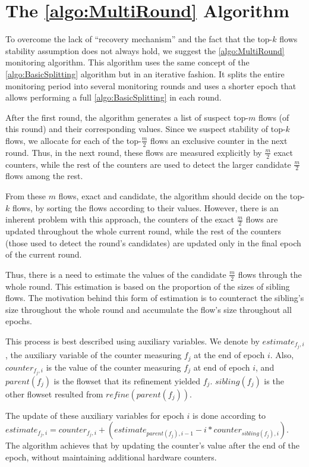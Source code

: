 \section{The \ref{algo:MultiRound} Algorithm}
To overcome the lack of ``recovery mechanism'' and the fact that the top-$k$ flows stability assumption does not always hold, we suggest the \ref{algo:MultiRound} monitoring algorithm.
This algorithm uses the same concept of the \ref{algo:BasicSplitting} algorithm but in an iterative fashion. It splits the entire monitoring period into several monitoring rounds and uses a shorter epoch that allows performing a full \ref{algo:BasicSplitting} in each round.

After the first round, the algorithm generates a list of suspect top-$m$ flows (of this round) and their corresponding values. Since we suspect stability of top-$k$ flows, we allocate for each of the top-$\frac{m}{2}$ flows an exclusive counter in the next round. Thus, in the next round, these flows are measured explicitly by $\frac{m}{2}$ exact counters, while the rest of the counters are used to detect the larger candidate $\frac{m}{2}$ flows among the rest.

From these $m$ flows, exact and candidate, the algorithm should decide on the top-$k$ flows, by sorting the flows according to their values.
However, there is an inherent problem with this approach, the counters of the exact $\frac{m}{2}$ flows are updated throughout the whole current round, while the rest of the counters (those used to detect the round's candidates) are updated only in the final epoch of the current round.

Thus, there is a need to estimate the values of the candidate $\frac{m}{2}$ flows through the whole round. This estimation is based on the proportion of the sizes of sibling flows. The motivation behind this form of estimation is to counteract the sibling's size throughout the whole round and accumulate the flow's size throughout all epochs.

This process is best described using auxiliary variables. We denote by $estimate_{f_j, i}$, the auxiliary variable of the counter measuring $f_j$ at the end of epoch $i$. Also, $counter_{f_j,i}$ is the value of the counter measuring $f_j$ at end of epoch $i$, and $parent(f_j)$ is the flowset that its refinement yielded $f_j$. $sibling(f_j)$ is the other flowset resulted from $refine(parent(f_j))$.

The update of these auxiliary variables for epoch $i$ is done according to $estimate_{f_j, i}=counter_{f_j, i} + (estimate_{parent(f_j), i-1} - i*counter_{sibling(f_j), i})$. The algorithm achieves that by updating the counter's value after the end of the epoch, without maintaining additional hardware counters.

